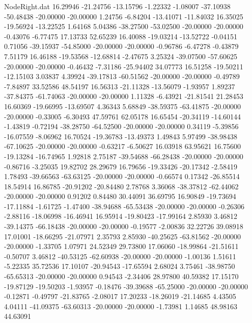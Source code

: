 \begin{filecontents}{NodeRight.dat}
  16.29946  -21.24756  -13.15796    -1.22332   -1.08007  -37.10938  -50.48438  -20.00000  -20.00000    1.24756   -6.84204  -13.41071  -11.84032
  16.35025  -19.56924  -13.22525     1.64168    5.04386  -38.27500  -53.02500  -20.00000  -20.00000   -0.43076   -6.77475   17.13733   52.65239
  16.40088  -19.03214  -13.52722    -0.04151    0.71056  -39.15937  -54.85000  -20.00000  -20.00000   -0.96786   -6.47278   -0.43879    7.51179
  16.46188  -19.53568  -12.68814    -2.47675    3.25324  -39.07500  -57.60625  -20.00000  -20.00000   -0.46432   -7.31186  -25.94402   34.07773
  16.51258  -19.50211  -12.15103     3.03837    4.39924  -39.17813  -60.51562  -20.00000  -20.00000   -0.49789   -7.84897   33.52586   48.54197
  16.56313  -21.11328  -13.56079    -1.93957    1.89237  -37.84375  -61.74063  -20.00000  -20.00000    1.11328   -6.43921  -21.81541   21.28453
  16.60369  -19.66995  -13.69507     4.36343    5.68849  -38.59375  -63.41875  -20.00000  -20.00000   -0.33005   -6.30493   47.59761   62.05178
  16.65454  -20.34119  -14.60144    -1.43819   -0.72194  -38.28750  -64.52500  -20.00000  -20.00000    0.34119   -5.39856  -16.07559   -8.06962
  16.70524  -19.36783  -13.49373     1.49843    5.97499  -38.98438  -67.10625  -20.00000  -20.00000   -0.63217   -6.50627   16.03918   63.95621
  16.75600  -19.13284  -16.74965     1.92818    2.75187  -39.54688  -66.28438  -20.00000  -20.00000   -0.86716   -3.25035   19.82702   28.29679
  16.79656  -19.33426  -20.17342    -2.58419    1.78493  -39.66563  -63.63125  -20.00000  -20.00000   -0.66574    0.17342  -26.85514   18.54914
  16.86785  -20.91202  -20.84480     2.78768    3.36068  -38.37812  -62.44062  -20.00000  -20.00000    0.91202    0.84480   30.44091   36.69795
  16.90849  -19.73694  -17.11884    -1.61725   -1.47400  -38.94688  -65.53438  -20.00000  -20.00000   -0.26306   -2.88116  -18.06998  -16.46941
  16.95914  -19.80423  -17.99164     2.85930    3.46812  -39.14375  -66.18438  -20.00000  -20.00000   -0.19577   -2.00836   32.22726   39.08918
  17.01001  -18.66295  -21.07971     2.35793    2.85930  -40.25625  -63.81562  -20.00000  -20.00000   -1.33705    1.07971   24.52349   29.73800
  17.06060  -18.99864  -21.51611    -0.50707    3.46812  -40.53125  -62.60938  -20.00000  -20.00000   -1.00136    1.51611   -5.22335   35.72536
  17.10107  -20.94543  -17.65594     2.68024    3.75461  -38.98750  -65.65313  -20.00000  -20.00000    0.94543   -2.34406   28.97800   40.59382
  17.15170  -19.87129  -19.50203    -1.93957   -0.18476  -39.39688  -65.25000  -20.00000  -20.00000   -0.12871   -0.49797  -21.83765   -2.08017
  17.20233  -18.26019  -21.14685     4.43505    4.04111  -41.09375  -63.60313  -20.00000  -20.00000   -1.73981    1.14685   48.98163   44.63091

\end{filecontents}
